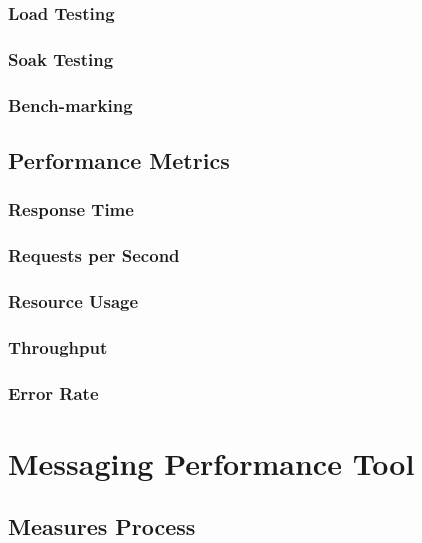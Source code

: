 \subsection*{Load Testing}

\subsection*{Soak Testing}
\label{Soak Testing}

\subsection*{Bench-marking}

\section{Performance Metrics}
\label{Performance Metrics}

\subsection{Response Time}

\subsection{Requests per Second}

\subsection{Resource Usage}

\subsection{Throughput}

\subsection{Error Rate}

\chapter{Messaging Performance Tool}
\label{Messaging Performance Tool}

\section{Measures Process}
\label{Measures Process}


